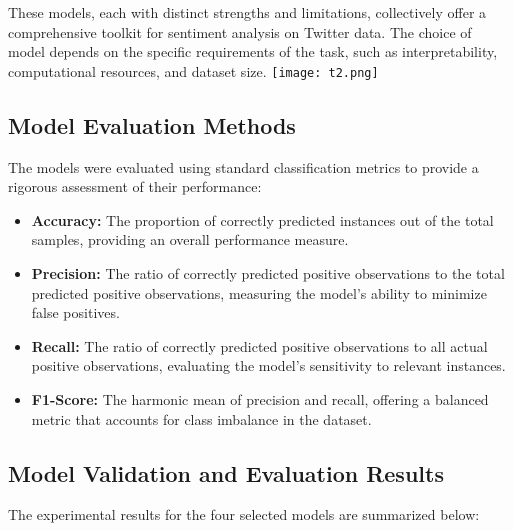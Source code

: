 \documentclass[journal]{IEEEtran}
\begin{document}
These models, each with distinct strengths and limitations, collectively offer a comprehensive toolkit for sentiment analysis on Twitter data. The choice of model depends on the specific requirements of the task, such as interpretability, computational resources, and dataset size.
\texttt{[image: t2.png]}
\subsection{\textbf{Model Evaluation Methods}}
The models were evaluated using standard classification metrics to provide a rigorous assessment of their performance:

\begin{itemize}
    \item \textbf{Accuracy:} The proportion of correctly predicted instances out of the total samples, providing an overall performance measure.
    \item \textbf{Precision:} The ratio of correctly predicted positive observations to the total predicted positive observations, measuring the model’s ability to minimize false positives.
    \item \textbf{Recall:} The ratio of correctly predicted positive observations to all actual positive observations, evaluating the model’s sensitivity to relevant instances.
    \item \textbf{F1-Score:} The harmonic mean of precision and recall, offering a balanced metric that accounts for class imbalance in the dataset.
\end{itemize}

\subsection{\textbf{Model Validation and Evaluation Results}}

The experimental results for the four selected models are summarized below:
\end{document}
